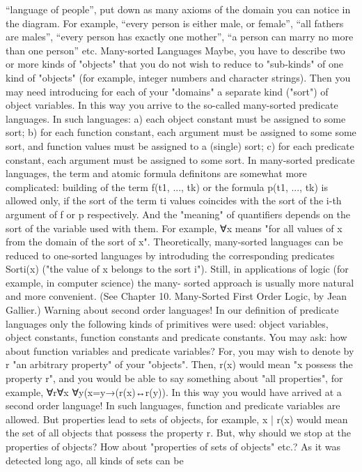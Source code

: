 “language of people”, put down as many axioms of the domain you can notice in the diagram. For
example, “every person is either male, or female”, “all fathers are males”, “every person has exactly one
mother”, “a person can marry no more than one person” etc.
Many-sorted Languages
Maybe, you have to describe two or more kinds of "objects" that you do not wish to reduce to "sub-kinds" of one kind of
"objects" (for example, integer numbers and character strings). Then you may need introducing for each of your "domains" a
separate kind ("sort") of object variables. In this way you arrive to the so-called many-sorted predicate languages. In such
languages: a) each object constant must be assigned to some sort; b) for each function constant, each argument must be
assigned to some some sort, and function values must be assigned to a (single) sort; c) for each predicate constant, each
argument must be assigned to some sort. In many-sorted predicate languages, the term and atomic formula definitons are
somewhat more complicated: building of the term f(t1, ..., tk) or the formula p(t1, ..., tk) is allowed only, if the sort of the term ti
values coincides with the sort of the i-th argument of f or p respectively. And the "meaning" of quantifiers depends on the sort
of the variable used with them. For example, ∀x means "for all values of x from the domain of the sort of x".
Theoretically, many-sorted languages can be reduced to one-sorted languages by introduding the corresponding predicates
Sorti(x) ("the value of x belongs to the sort i"). Still, in applications of logic (for example, in computer science) the many-
sorted approach is usually more natural and more convenient. (See Chapter 10. Many-Sorted First Order Logic, by Jean
Gallier.)
Warning about second order languages!
In our definition of predicate languages only the following kinds of primitives were used: object variables, object constants,
function constants and predicate constants. You may ask: how about function variables and predicate variables? For, you
may wish to denote by r "an arbitrary property" of your "objects". Then, r(x) would mean "x possess the property r", and you
would be able to say something about "all properties", for example, ∀r∀x ∀y(x=y→(r(x)↔r(y)). In this way you would have
arrived at a second order language! In such languages, function and predicate variables are allowed. But properties lead to
sets of objects, for example, {x | r(x)} would mean the set of all objects that possess the property r. But, why should we stop at
the properties of objects? How about "properties of sets of objects" etc.? As it was detected long ago, all kinds of sets can be
